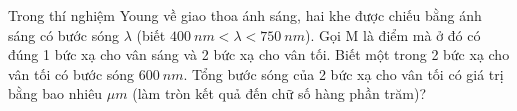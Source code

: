 \begin{ex}
Trong thí nghiệm Young về giao thoa ánh sáng, hai khe được chiếu bằng ánh sáng có bước sóng $\lambda$ (biết $400\ nm < \lambda < 750\ nm$). Gọi M là điểm mà ở đó có đúng 1 bức xạ cho vân sáng và 2 bức xạ cho vân tối. Biết một trong 2 bức xạ cho vân tối có bước sóng $600\ nm$. Tổng bước sóng của 2 bức xạ cho vân tối có giá trị bằng bao nhiêu $\mu m$ (làm tròn kết quả đến chữ số hàng phần trăm)?
\end{ex}
